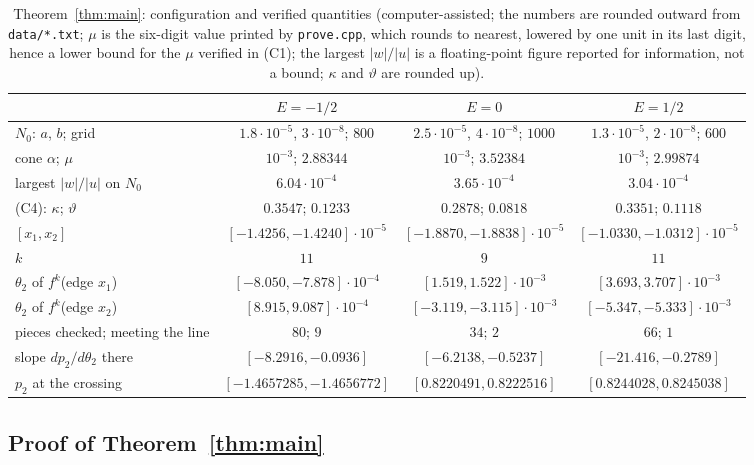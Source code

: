 \documentclass[11pt]{article}
\theoremstyle{definition}
\begin{document}
\begin{table}[ht]
\centering\footnotesize\setlength{\tabcolsep}{4pt}
\begin{tabular}{@{}lccc@{}}
\toprule
 & $E = -1/2$ & $E = 0$ & $E = 1/2$ \\
\midrule
$N_0$: $a$, $b$; grid & $1.8\cdot10^{-5}$, $3\cdot10^{-8}$; $800$ & $2.5\cdot10^{-5}$, $4\cdot10^{-8}$; $1000$ & $1.3\cdot10^{-5}$, $2\cdot10^{-8}$; $600$ \\
cone $\alpha$; $\mu$ & $10^{-3}$; $2.88344$ & $10^{-3}$; $3.52384$ & $10^{-3}$; $2.99874$ \\
largest $|w|/|u|$ on $N_0$ & $6.04\cdot10^{-4}$ & $3.65\cdot10^{-4}$ & $3.04\cdot10^{-4}$ \\
(C4): $\kappa$; $\vartheta$ & $0.3547$; $0.1233$ & $0.2878$; $0.0818$ & $0.3351$; $0.1118$ \\
$[x_1, x_2]$ & $[-1.4256, -1.4240]\cdot10^{-5}$ & $[-1.8870, -1.8838]\cdot10^{-5}$ & $[-1.0330, -1.0312]\cdot10^{-5}$ \\
$k$ & $11$ & $9$ & $11$ \\
$\theta_2$ of $f^k$(edge $x_1$) & $[-8.050, -7.878]\cdot10^{-4}$ & $[1.519, 1.522]\cdot10^{-3}$ & $[3.693, 3.707]\cdot10^{-3}$ \\
$\theta_2$ of $f^k$(edge $x_2$) & $[8.915, 9.087]\cdot10^{-4}$ & $[-3.119, -3.115]\cdot10^{-3}$ & $[-5.347, -5.333]\cdot10^{-3}$ \\
pieces checked; meeting the line & $80$; $9$ & $34$; $2$ & $66$; $1$ \\
slope $dp_2/d\theta_2$ there & $[-8.2916, -0.0936]$ & $[-6.2138, -0.5237]$ & $[-21.416, -0.2789]$ \\
$p_2$ at the crossing & $[-1.4657285, -1.4656772]$ & $[0.8220491, 0.8222516]$ & $[0.8244028, 0.8245038]$ \\
\bottomrule
\end{tabular}
\caption{Theorem~\ref{thm:main}: configuration and verified quantities (computer-assisted; the numbers are rounded outward from \texttt{data/*.txt}; $\mu$ is the six-digit value printed by \texttt{prove.cpp}, which rounds to nearest, lowered by one unit in its last digit, hence a lower bound for the $\mu$ verified in (C1); the largest $|w|/|u|$ is a floating-point figure reported for information, not a bound; $\kappa$ and $\vartheta$ are rounded up).}\label{tab:comp}
\end{table}

\subsection{Proof of Theorem~\ref{thm:main}}
\end{document}
